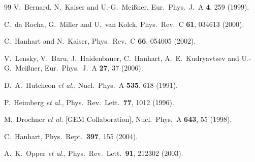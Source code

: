 \documentclass[aps,rmp,nofootinbib,twocolumn,floatfix]{revtex4}
\begin{document}
\begin{thebibliography}{99}
  V.~Bernard, N.~Kaiser and U.-G.~Mei{\ss}ner,
  Eur.\ Phys.\ J.\  A {\bf 4}, 259 (1999).

  C.~da Rocha, G.~Miller and U.~van Kolck,
  Phys.\ Rev.\  C {\bf 61}, 034613 (2000).

  C.~Hanhart and N.~Kaiser,
  Phys.\ Rev.\  C {\bf 66}, 054005 (2002).

  V.~Lensky, V.~Baru, J.~Haidenbauer, C.~Hanhart, A.~E.~Kudryavtsev and U.-G.~Mei{\ss}ner,
  Eur.\ Phys.\ J.\  A {\bf 27}, 37 (2006).

  D.~A.~Hutcheon {\it et al.},
  Nucl.\ Phys.\  A {\bf 535}, 618 (1991).

  P.~Heimberg {\it et al.},
  Phys.\ Rev.\ Lett.\  {\bf 77}, 1012 (1996).

  M.~Drochner {\it et al.}  [GEM Collaboration],
  Nucl.\ Phys.\  A {\bf 643}, 55 (1998).

  C.~Hanhart,
  Phys.\ Rept.\  {\bf 397}, 155 (2004).


  A.~K.~Opper {\it et al.},
  Phys.\ Rev.\ Lett.\  {\bf 91}, 212302 (2003).


\end{thebibliography}
\end{document}
